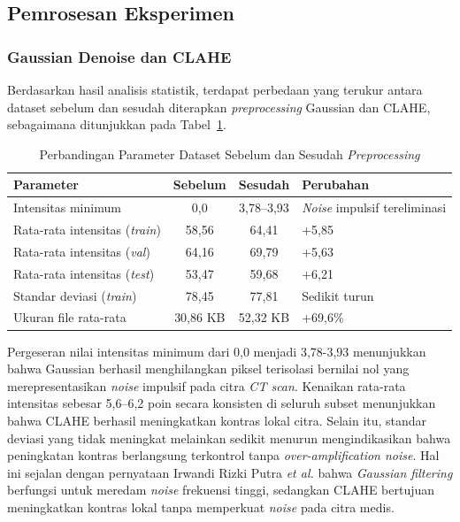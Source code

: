 \subsection{Pemrosesan Eksperimen}
\subsubsection{Gaussian Denoise dan CLAHE}
Berdasarkan hasil analisis statistik, terdapat perbedaan yang terukur antara dataset sebelum dan sesudah diterapkan \textit{preprocessing} Gaussian dan CLAHE, sebagaimana ditunjukkan pada Tabel~\ref{tab:analisis_statistik}.

\begin{table}[htbp]
	\centering
	\caption{Perbandingan Parameter Dataset Sebelum dan Sesudah \textit{Preprocessing}}
	\label{tab:analisis_statistik}
	\begin{tabular}{|l|c|c|l|}
		\hline
		\textbf{Parameter} & \textbf{Sebelum} & \textbf{Sesudah} & \textbf{Perubahan} \\ \hline
		Intensitas minimum & 0,0 & 3,78--3,93 & \textit{Noise} impulsif tereliminasi \\ \hline
		Rata-rata intensitas (\textit{train}) & 58,56 & 64,41 & +5,85 \\ \hline
		Rata-rata intensitas (\textit{val}) & 64,16 & 69,79 & +5,63 \\ \hline
		Rata-rata intensitas (\textit{test}) & 53,47 & 59,68 & +6,21 \\ \hline
		Standar deviasi (\textit{train}) & 78,45 & 77,81 & Sedikit turun \\ \hline
		Ukuran file rata-rata & 30,86 KB & 52,32 KB & +69,6\% \\ \hline
	\end{tabular}
\end{table}

Pergeseran nilai intensitas minimum dari 0,0 menjadi 3,78-3,93 menunjukkan bahwa Gaussian berhasil menghilangkan piksel terisolasi bernilai nol yang merepresentasikan \textit{noise} impulsif pada citra \textit{CT scan}. Kenaikan rata-rata intensitas sebesar 5,6--6,2 poin secara konsisten di seluruh subset menunjukkan bahwa CLAHE berhasil meningkatkan kontras lokal citra. Selain itu, standar deviasi yang tidak meningkat melainkan sedikit menurun mengindikasikan bahwa peningkatan kontras berlangsung terkontrol tanpa \textit{over-amplification noise}. Hal ini sejalan dengan pernyataan Irwandi Rizki Putra \textit{et al.} \cite{Putra2025} bahwa \textit{Gaussian filtering} berfungsi untuk meredam \textit{noise} frekuensi tinggi, sedangkan CLAHE bertujuan meningkatkan kontras lokal tanpa memperkuat \textit{noise} pada citra medis.

